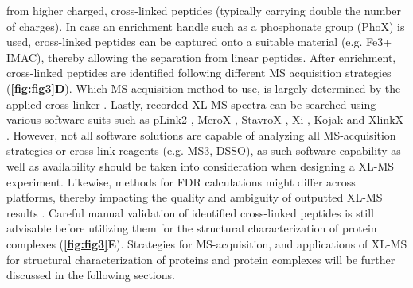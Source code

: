 from higher charged, cross-linked peptides (typically carrying double the number of charges). In case an enrichment handle such as a phosphonate group (PhoX) is used, cross-linked peptides can be captured onto a suitable material (e.g. Fe3+ IMAC), thereby allowing the separation from linear peptides. After enrichment, cross-linked peptides are identified following different MS acquisition strategies (\textbf{\autoref{fig:fig3}D}). Which MS acquisition method to use, is largely determined by the applied cross-linker \cite{Liu_2017a}. Lastly, recorded XL-MS spectra can be searched using various software suits such as pLink2 \cite{Chen_2019b}, MeroX \cite{Gotze_2015}, StavroX \cite{Gotze_2012}, Xi \cite{Chen_2019a}, Kojak \cite{Hoopmann_2015} and XlinkX \cite{Klykov_2018}. However, not all software solutions are capable of analyzing all MS-acquisition strategies or cross-link reagents (e.g. MS3, DSSO), as such software capability as well as availability should be taken into consideration when designing a XL-MS experiment. Likewise, methods for FDR calculations might differ across platforms, thereby impacting the quality and ambiguity of outputted XL-MS results \cite{Matzinger_2022}. Careful manual validation of identified cross-linked peptides is still advisable before utilizing them for the structural characterization of protein complexes (\textbf{\autoref{fig:fig3}E}). Strategies for MS-acquisition, and applications of XL-MS for structural characterization of proteins and protein complexes will be further discussed in the following sections.

